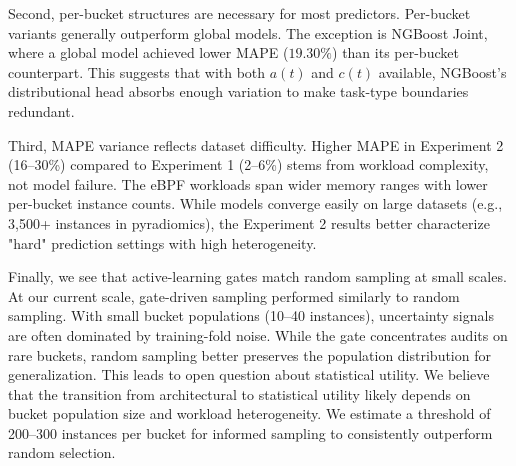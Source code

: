 Second, per-bucket structures are necessary for most predictors. Per-bucket variants generally outperform global models. The exception is NGBoost Joint, where a global model achieved lower MAPE ($19.30\%$) than its per-bucket counterpart. This suggests that with both $a(t)$ and $c(t)$ available, NGBoost’s distributional head absorbs enough variation to make task-type boundaries redundant.

Third, MAPE variance reflects dataset difficulty. Higher MAPE in Experiment 2 (16–30\%) compared to Experiment 1 (2–6\%) stems from workload complexity, not model failure. The eBPF workloads span wider memory ranges with lower per-bucket instance counts. While models converge easily on large datasets (e.g., 3,500+ instances in pyradiomics), the Experiment 2 results better characterize "hard" prediction settings with high heterogeneity.

Finally, we see that active-learning gates match random sampling at small scales. At our current scale, gate-driven sampling performed similarly to random sampling. With small bucket populations (10–40 instances), uncertainty signals are often dominated by training-fold noise. While the gate concentrates audits on rare buckets, random sampling better preserves the population distribution for generalization. %
This leads to open question about statistical utility. We believe that the transition from architectural to statistical utility likely depends on bucket population size and workload heterogeneity. We estimate a threshold of 200–300 instances per bucket for informed sampling to consistently outperform random selection. %